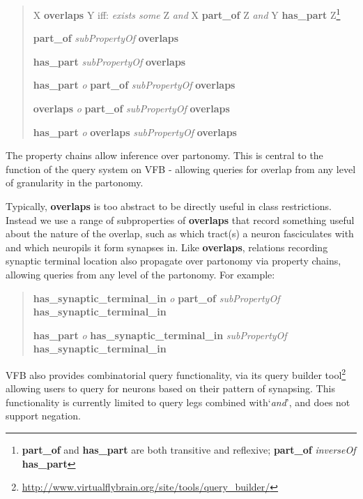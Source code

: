 \documentclass[runningheads,a4paper]{llncs}
\begin{document}
\begin{quote}
X \textbf{overlaps} Y iff: \textit{exists some} Z \textit{and}
X \textbf{part\_of} Z \textit{and} Y \textbf{has\_part}
Z\footnote{\textbf{part\_of} and \textbf{has\_part} are both
  transitive and reflexive; \textbf{part\_of} \textit{inverseOf}
  \textbf{has\_part}}

\textbf{part\_of} \textit{subPropertyOf}
  \textbf{overlaps}

\textbf{has\_part} \textit{subPropertyOf} \textbf{overlaps}

\textbf{has\_part} \textit{o} \textbf{part\_of} \textit{subPropertyOf}
\textbf{overlaps}

\textbf{overlaps} \textit{o} \textbf{part\_of} \textit{subPropertyOf} \textbf{overlaps}

\textbf{has\_part} \textit{o} \textbf{overlaps} \textit{subPropertyOf}
\textbf{overlaps}\end{quote}

The property chains allow inference over partonomy.  This is central
to the function of the query system on VFB - allowing queries for
overlap from any level of granularity in the partonomy.

Typically, \textbf{overlaps} is too abstract to be directly useful in
class restrictions. Instead we use a range of subproperties of
\textbf{overlaps} that record something useful about the nature of the
overlap, such as which tract(s) a neuron fasciculates with and which
neuropils it form synapses in.  Like \textbf{overlaps}, relations
recording synaptic terminal location also propagate over partonomy via
property chains, allowing queries from any level of the partonomy.
For example:

\begin{quote}
\textbf{has\_synaptic\_terminal\_in} \textit{o} \textbf{part\_of} \textit{subPropertyOf}
\textbf{has\_synaptic\_terminal\_in}

\textbf{has\_part} \textit{o} \textbf{has\_synaptic\_terminal\_in} \textit{subPropertyOf}
\textbf{has\_synaptic\_terminal\_in}
\end{quote}

VFB also provides combinatorial query functionality, via its
query builder tool\footnote{\url{http://www.virtualflybrain.org/site/tools/query_builder/}}
allowing users to query for neurons based on their pattern of
synapsing.  This functionality is currently limited to query legs
combined with`\textit {and}', and does not support negation.

\end{document}
